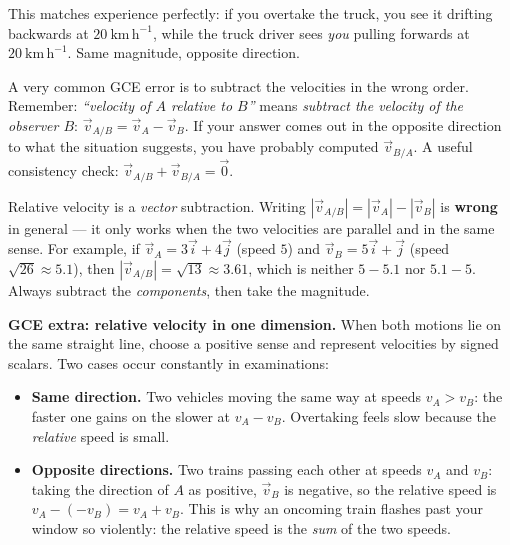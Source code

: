 \documentclass[11pt]{article}
\begin{document}
This matches experience perfectly: if you overtake the truck, you see it drifting backwards at $20\ \mathrm{km\,h^{-1}}$, while the truck driver sees \emph{you} pulling forwards at $20\ \mathrm{km\,h^{-1}}$. Same magnitude, opposite direction.

\begin{attention}
A very common GCE error is to subtract the velocities in the wrong order. Remember: \emph{``velocity of $A$ relative to $B$''} means \emph{subtract the velocity of the observer $B$}: $\vec{v}_{A/B} = \vec{v}_A - \vec{v}_B$. If your answer comes out in the opposite direction to what the situation suggests, you have probably computed $\vec{v}_{B/A}$. A useful consistency check: $\vec{v}_{A/B} + \vec{v}_{B/A} = \vec{0}$.
\end{attention}

\begin{attention}
Relative velocity is a \emph{vector} subtraction. Writing $|\vec{v}_{A/B}| = |\vec{v}_A| - |\vec{v}_B|$ is \textbf{wrong} in general — it only works when the two velocities are parallel and in the same sense. For example, if $\vec{v}_A = 3\vec{i} + 4\vec{j}$ (speed $5$) and $\vec{v}_B = 5\vec{i} + \vec{j}$ (speed $\sqrt{26} \approx 5.1$), then $|\vec{v}_{A/B}| = \sqrt{13} \approx 3.61$, which is neither $5 - 5.1$ nor $5.1 - 5$. Always subtract the \emph{components}, then take the magnitude.
\end{attention}

\textbf{GCE extra: relative velocity in one dimension.} When both motions lie on the same straight line, choose a positive sense and represent velocities by signed scalars. Two cases occur constantly in examinations:

\begin{itemize}
\item \textbf{Same direction.} Two vehicles moving the same way at speeds $v_A > v_B$: the faster one gains on the slower at $v_A - v_B$. Overtaking feels slow because the \emph{relative} speed is small.
\item \textbf{Opposite directions.} Two trains passing each other at speeds $v_A$ and $v_B$: taking the direction of $A$ as positive, $\vec{v}_B$ is negative, so the relative speed is $v_A - (-v_B) = v_A + v_B$. This is why an oncoming train flashes past your window so violently: the relative speed is the \emph{sum} of the two speeds.
\end{itemize}
\end{document}
